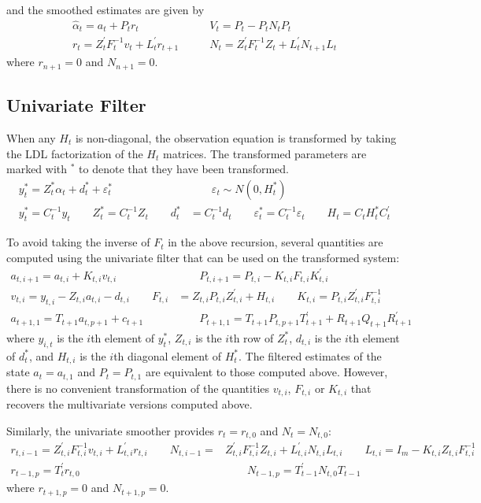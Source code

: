 \documentclass[12pt]{article}
\begin{document}
	and the smoothed estimates are given by
	\begin{align*}
	\hat{\alpha}_t = a_t + P_t r_t &\qquad V_t = P_t - P_t N_t P_t \\ 
	r_t = Z_t^\prime F_t^{-1} v_t + L_t^\prime r_{t+1} &\qquad N_{t} = Z_t^\prime F_t^{-1} Z_t + L_t^\prime N_{t+1} L_t
	\end{align*}
	where $r_{n+1} = 0$ and $N_{n+1} = 0$. 

\subsection*{Univariate Filter}
	When any $H_t$ is non-diagonal, the observation equation is transformed by taking the LDL factorization of the $H_t$ matrices. The transformed parameters are marked with $^*$ to denote that they have been transformed.
	\begin{align*}
	y_t^* = Z_t^* \alpha_t + d_t^* + \varepsilon_t^* &\qquad \varepsilon_t \sim N(0, H_t^*)\\
	y_t^* = C_t^{-1} y_t \qquad Z_t^* = C_t^{-1} Z_t \qquad d_t^* &= C_t^{-1} d_t \qquad \varepsilon_t^* = C_t^{-1} \varepsilon_t \qquad H_t = C_t H_t^* C_t^\prime
	\end{align*}

	To avoid taking the inverse of $F_t$ in the above recursion, several quantities are computed using the univariate filter that can be used on the transformed system: 
	\begin{align*}
	a_{t, i+1} = a_{t,i} + K_{t,i} v_{t,i} &\qquad P_{t,i+1} = P_{t,i} - K_{t,i} F_{t,i} K_{t,i}^{\prime} \\
	v_{t,i} = y_{t,i} - Z_{t,i} a_{t,i} - d_{t,i} \qquad F_{t,i} &= Z_{t,i} P_{t,i} Z_{t,i}^\prime + H_{t,i} \qquad K_{t,i} = P_{t,i} Z_{t,i}^\prime F_{t,i}^{-1} \\ 
	a_{t+1,1} = T_{t+1} a_{t, p+1} + c_{t+1} &\qquad P_{t+1,1} = T_{t+1} P_{t,p+1} T_{t+1}^\prime + R_{t+1} Q_{t+1} R_{t+1}^\prime
	\end{align*}
	where $y_{i,t}$ is the $i$th element of $y_t^*$, $Z_{t,i}$ is the $i$th row of $Z_t^*$, $d_{t,i}$ is the $i$th element of $d_t^*$, and $H_{t,i}$ is the $i$th diagonal element of $H_t^*$. The filtered estimates of the state $a_t = a_{t,1}$ and $P_t = P_{t,1}$ are equivalent to those computed above. However, there is no convenient transformation of the quantities $v_{t,i}$, $F_{t,i}$ or $K_{t,i}$ that recovers the multivariate versions computed above.

	Similarly, the univariate smoother provides $r_t = r_{t,0}$ and $N_t = N_{t,0}$:
	\begin{align*}
	r_{t,i-1} = Z_{t,i}^\prime F_{t,i}^{-1} v_{t,i} + L_{t,i}^{\prime} r_{t,i} \qquad N_{t,i-1} =& Z_{t,i}^\prime F_{t,i}^{-1} Z_{t,i} + L_{t,i}^{\prime} N_{t,i} L_{t,i} \qquad L_{t,i} = I_m - K_{t,i} Z_{t,i} F_{t,i}^{-1}\\
	r_{t-1,p} = T_{t}^\prime r_{t,0} &\qquad N_{t-1,p} = T_{t-1}^\prime N_{t,0} T_{t-1}
	\end{align*}
	where $r_{t+1,p} = 0$ and $N_{t+1,p} = 0$. 
\end{document}
